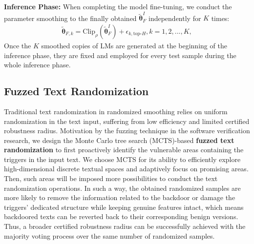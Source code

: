 \textbf{Inference Phase:} When completing the model fine-tuning, we conduct the parameter smoothing to the finally obtained $\tilde{\mathbf{\theta}}^I_F$ independently for $K$ times:
\begin{equation}
\begin{aligned}
\tilde{\mathbf{\theta}}_{F,k} = \text{Clip}_{\rho}(\tilde{\mathbf{\theta}}^I_F) + \epsilon_{k, \text{top-}H}, k=1,2,...,K,
\end{aligned}
\label{eq: inference parameter smoothing}
\end{equation}
Once the $K$ smoothed copies of LMs are generated at the beginning of the inference phase, they are fixed and employed for every test sample during the whole inference phase. 

\subsection{Fuzzed Text Randomization}
\label{sec: fuzzed text randomization}
\vspace{-1mm}
Traditional text randomization in randomized smoothing relies on uniform randomization in the text input, suffering from low efficiency and limited certified robustness radius. Motivation by the fuzzing technique in the software verification research, we design the Monte Carlo tree search (MCTS)-based \textbf{fuzzed text randomization} to first proactively identify the vulnerable areas containing the triggers in the input text. We choose MCTS for its ability to efficiently explore high-dimensional discrete textual spaces and adaptively focus on promising areas.
Then, such areas will be imposed more possibilities to conduct the text randomization operations. In such a way, the obtained randomized samples are more likely to remove the information related to the backdoor or damage the triggers' dedicated structure while keeping genuine features intact, which means backdoored texts can be reverted back to their corresponding benign versions. Thus, a broader certified robustness radius can be successfully achieved with the majority voting process over the same number of randomized samples.


